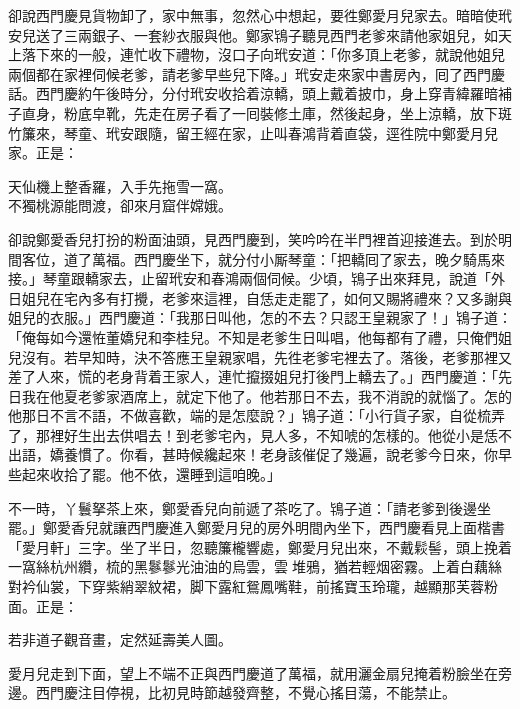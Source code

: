 卻說西門慶見貨物卸了，家中無事，忽然心中想起，要徃鄭愛月兒家去。暗暗使玳安兒送了三兩銀子、一套紗衣服與他。鄭家鴇子聽見西門老爹來請他家姐兒，如天上落下來的一般，連忙收下禮物，沒口子向玳安道：「你多頂上老爹，就說他姐兒兩個都在家裡伺候老爹，請老爹早些兒下降。」玳安走來家中書房內，囘了西門慶話。西門慶約午後時分，分付玳安收拾着涼轎，頭上戴着披巾，身上穿青緯羅暗補子直身，粉底皁靴，先走在房子看了一囘裝修土庫，然後起身，坐上涼轎，放下斑竹簾來，琴童、玳安跟隨，留王經在家，止叫春鴻背着直袋，逕徃院中鄭愛月兒家。正是：

\begin{myquote} 
天仙機上整香羅，入手先拖雪一窩。\\不獨桃源能問渡，卻來月窟伴嫦娥。
\end{myquote} 

卻說鄭愛香兒打扮的粉面油頭，見西門慶到，笑吟吟在半門裡首迎接進去。到於明間客位，道了萬福。西門慶坐下，就分付小厮琴童：「把轎囘了家去，晚夕騎馬來接。」琴童跟轎家去，止留玳安和春鴻兩個伺候。少頃，鴇子出來拜見，說道「外日姐兒在宅內多有打攪，老爹來這裡，自恁走走罷了，如何又賜將禮來？又多謝與姐兒的衣服。」西門慶道：「我那日叫他，怎的不去？只認王皇親家了！」鴇子道：「俺每如今還恠董嬌兒和李桂兒。{}不知是老爹生日叫唱，他每都有了禮，只俺們姐兒沒有。若早知時，決不答應王皇親家唱，先徃老爹宅裡去了。落後，老爹那裡又差了人來，慌的老身背着王家人，連忙攛掇姐兒打後門上轎去了。」西門慶道：「先日我在他夏老爹家酒席上，就定下他了。他若那日不去，我不消說的就惱了。怎的他那日不言不語，不做喜歡，{}端的是怎麼說？」鴇子道：「小行貨子家，自從梳弄了，那裡好生出去供唱去！到老爹宅內，見人多，不知唬的怎樣的。他從小是恁不出語，嬌養慣了。{}你看，甚時候纔起來！老身該催促了幾遍，說老爹今日來，你早些起來收拾了罷。他不依，還睡到這咱晚。」

不一時，丫鬟拏茶上來，鄭愛香兒向前遞了茶吃了。鴇子道：「請老爹到後邊坐罷。」鄭愛香兒就讓西門慶進入鄭愛月兒的房外明間內坐下，西門慶看見上面楷書「愛月軒」三字。坐了半日，忽聽簾櫳響處，鄭愛月兒出來，不戴鬏髻，頭上挽着一窩絲杭州纘，梳的黑鬖鬖光油油的烏雲，雲𩬆堆鴉，猶若輕烟密霧。上着白藕絲對衿仙裳，下穿紫綃翠紋裙，脚下露紅鴛鳳嘴鞋，前搖寶玉玲瓏，越顯那芙蓉粉面。正是：

\begin{myquote} 
若非道子觀音畫，定然延壽美人圖。
\end{myquote} 

愛月兒走到下面，望上不端不正與西門慶道了萬福，就用灑金扇兒掩着粉臉坐在旁邊。西門慶注目停視，比初見時節越發齊整，不覺心搖目蕩，不能禁止。

